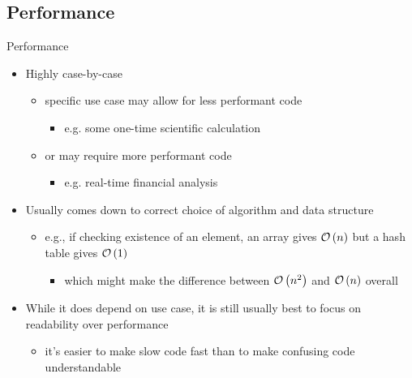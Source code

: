 \subsection{Performance}
\begin{frame}{Performance}
    \pause
    \begin{itemize}[<+->]
        \item Highly case-by-case
              \begin{itemize}[<+->]
                  \item specific use case may allow for less performant code
                        \begin{itemize}[<+->]\item e.g. some one-time scientific calculation\end{itemize}
                  \item or may require more performant code
                        \begin{itemize}[<+->]\item e.g. real-time financial analysis\end{itemize}
              \end{itemize}
        \item Usually comes down to correct choice of algorithm and data structure
              \begin{itemize}[<+->]
                  \item e.g., if checking existence of an element, an array gives $\mathcal{O}\left(n\right)$ but a hash table gives $\mathcal{O}\left(1\right)$
                        \begin{itemize}[<+->]\item which might make the difference between $\mathcal{O}\left(n^2\right)$ and $\mathcal{O}\left(n\right)$ overall\end{itemize}
              \end{itemize}
        \item While it does depend on use case, it is still usually best to focus on readability over performance
              \begin{itemize}[<+->]\item it's easier to make slow code fast than to make confusing code understandable\end{itemize}
    \end{itemize}
\end{frame}